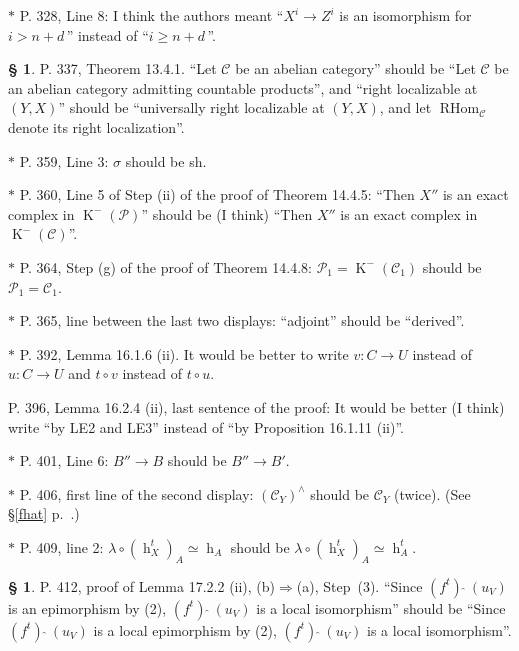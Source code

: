 \documentclass[12pt]{article}%
\theoremstyle{remark}
\theoremstyle{definition}
\newtheorem{s}[thm]{\S}%
\newcommand{\nn}{\noindent}
\newcommand{\cc}{\mathcal}
\newcommand{\mc}{\mathcal}
\newcommand{\oo}{\operatorname}
\newcommand{\C}{\mathcal C}
\newcommand{\fthat}{(f^t)\ \widehat{}\ }
\newcommand{\then}{\Rightarrow}
\begin{document}
\noindent $*$ P. 328, Line 8: I think the authors meant ``$X^i\to Z^i$ is an isomorphism for $i>n+d\,$'' instead of ``$i\ge n+d\,$''.

\begin{s}\label{1341}
P. 337, Theorem 13.4.1. ``Let $\C$ be an abelian category'' should be ``Let $\C$ be an abelian category admitting countable products'', and ``right localizable at $(Y,X)$'' should be ``universally right localizable at $(Y,X)$, and let $\oo{RHom}_\C$ denote its right localization''.
\end{s}

\noindent $*$ P. 359, Line 3: $\sigma$ should be sh.


\noindent $*$ P. 360, Line 5 of Step (ii) of the proof of Theorem 14.4.5: ``Then $X''$ is an exact complex in $\oo K^-(\cc P)$'' should be (I think) ``Then $X''$ is an exact complex in $\oo K^-(\cc C)$''.


\noindent $*$ P. 364, Step (g) of the proof of Theorem 14.4.8: $\mc P_1=\oo K^-(\C_1)$ should be $\mc P_1=\C_1$.

\noindent $*$ P. 365, line between the last two displays: ``adjoint'' should be ``derived''.

\noindent $*$ P. 392, Lemma 16.1.6 (ii). It would be better to write $v:C\to U$ instead of $u:C\to U$ and $t\circ v$ instead of $t\circ u$.

\nn P. 396, Lemma 16.2.4 (ii), last sentence of the proof: It would be better (I think) write ``by LE2 and LE3'' instead of ``by Proposition 16.1.11 (ii)''.

\noindent $*$ P. 401, Line 6: $B''\to B$ should be $B''\to B'$.

\nn $*$ P. 406, first line of the second display: $(\C_Y)^\wedge$ should be $\C_Y$ (twice). (See \S\ref{fhat} p.~\pageref{fhat}.)

\nn$*$ P. 409, line 2: $\lambda\circ(\oo h_X^t)_A\simeq\oo h_A$ should be $\lambda\circ(\oo h_X^t)_A\simeq\oo h_A^t$. 

\begin{s}\label{1722}
P. 412, proof of Lemma 17.2.2 (ii), (b)$\then$(a), Step~(3). ``Since $\fthat(u_V)$ is an epimorphism by (2), $\fthat(u_V)$ is a local isomorphism'' should be ``Since $\fthat(u_V)$ is a local epimorphism by (2), $\fthat(u_V)$ is a local isomorphism''.
\end{s}
\end{document}

